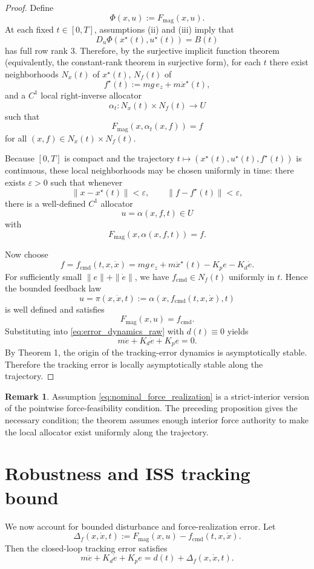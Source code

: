 \documentclass[11pt]{article}
\theoremstyle{definition}
\newtheorem{remark}{Remark}
\begin{document}
\begin{proof}
Define
\[
 \Phi(x,u):=F_{\mathrm{mag}}(x,u).
\]
At each fixed $t\in[0,T]$, assumptions (ii) and (iii) imply that
\[
 D_u\Phi(x^\star(t),u^\star(t)) = B(t)
\]
has full row rank $3$. Therefore, by the surjective implicit function theorem (equivalently, the constant-rank theorem in surjective form), for each $t$ there exist neighborhoods $N_x(t)$ of $x^\star(t)$, $N_f(t)$ of
\[
 f^\star(t):=mg\,e_z+m\ddot x^\star(t),
\]
and a $C^1$ local right-inverse allocator
\[
 \alpha_t:N_x(t)\times N_f(t)\to U
\]
such that
\[
 F_{\mathrm{mag}}(x,\alpha_t(x,f))=f
\]
for all $(x,f)\in N_x(t)\times N_f(t)$.

Because $[0,T]$ is compact and the trajectory $t\mapsto(x^\star(t),u^\star(t),f^\star(t))$ is continuous, these local neighborhoods may be chosen uniformly in time: there exists $\varepsilon>0$ such that whenever
\[
 \|x-x^\star(t)\|<\varepsilon,
 \qquad
 \|f-f^\star(t)\|<\varepsilon,
\]
there is a well-defined $C^1$ allocator
\[
 u=\alpha(x,f,t)\in U
\]
with
\[
 F_{\mathrm{mag}}(x,\alpha(x,f,t))=f.
\]

Now choose
\[
 f = f_{\mathrm{cmd}}(t,x,\dot x)
 = mg\,e_z+m\ddot x^\star(t)-K_p e-K_d\dot e.
\]
For sufficiently small $\|e\|+\|\dot e\|$, we have $f_{\mathrm{cmd}}\in N_f(t)$ uniformly in $t$. Hence the bounded feedback law
\[
 u=\pi(x,\dot x,t):=\alpha(x,f_{\mathrm{cmd}}(t,x,\dot x),t)
\]
is well defined and satisfies
\[
 F_{\mathrm{mag}}(x,u)=f_{\mathrm{cmd}}.
\]
Substituting into \eqref{eq:error_dynamics_raw} with $d(t)\equiv0$ yields
\[
 m\ddot e + K_d\dot e + K_p e =0.
\]
By Theorem 1, the origin of the tracking-error dynamics is asymptotically stable. Therefore the tracking error is locally asymptotically stable along the trajectory.
\end{proof}

\begin{remark}
Assumption \eqref{eq:nominal_force_realization} is a strict-interior version of the pointwise force-feasibility condition. The preceding proposition gives the necessary condition; the theorem assumes enough interior force authority to make the local allocator exist uniformly along the trajectory.
\end{remark}

\section{Robustness and ISS tracking bound}

We now account for bounded disturbance and force-realization error. Let
\begin{equation}
 \Delta_f(x,\dot x,t)
 := F_{\mathrm{mag}}(x,u)-f_{\mathrm{cmd}}(t,x,\dot x).
 \label{eq:deltaf}
\end{equation}
Then the closed-loop tracking error satisfies
\begin{equation}
 m\ddot e + K_d\dot e + K_p e = d(t)+\Delta_f(x,\dot x,t).
 \label{eq:tracking_with_disturbance}
\end{equation}
\end{document}
